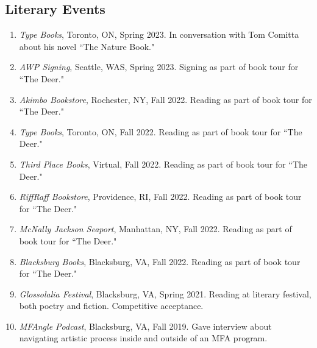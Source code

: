     \subsection{Literary Events}
    \begin{enumerate}
    \item \emph{Type Books}, Toronto, ON, Spring 2023. \subitem In conversation with Tom Comitta about his novel ``The Nature Book." \\
    \item \emph{AWP Signing}, Seattle, WAS, Spring 2023. \subitem Signing as part of book tour for ``The Deer." \\
    \item \emph{Akimbo Bookstore}, Rochester, NY, Fall 2022. \subitem Reading as part of book tour for ``The Deer." \\
    \item \emph{Type Books}, Toronto, ON, Fall 2022.  \subitem Reading as part of book tour for ``The Deer." \\
     \item \emph{Third Place Books}, Virtual, Fall 2022.  \subitem Reading as part of book tour for ``The Deer." \\
    \item \emph{RiffRaff Bookstore}, Providence, RI, Fall 2022. \subitem Reading as part of book tour for ``The Deer." \\
    \item \emph{McNally Jackson Seaport}, Manhattan, NY, Fall 2022. \subitem Reading as part of book tour for ``The Deer." \\
    \item \emph{Blacksburg Books}, Blacksburg, VA, Fall 2022. \subitem Reading as part of book tour for ``The Deer." \\
      \item  \emph{Glossolalia Festival}, Blacksburg, VA, Spring 2021. \subitem Reading at literary festival, both poetry and fiction. Competitive acceptance. \\
  \item  \emph{MFAngle Podcast}, Blacksburg, VA, Fall 2019. \subitem Gave interview about navigating artistic process inside and outside of an MFA program.
 
 \end{enumerate}
